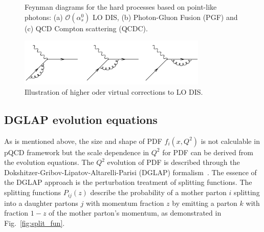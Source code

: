 \begin{figure}
	\begin{center}
	\quad
	\quad
	\caption[LO and NLO DIS feynman diagrams]{Feynman diagrams for the hard processes 
	based on point-like photons: (a) $\mathcal{O}(\alpha^{0}_{s}) $ LO DIS, (b) 
	Photon-Gluon Fusion (PGF) and (c) QCD Compton scattering (QCDC).}
	\label{fig:DISgraph}
	\end{center}
\end{figure}


\begin{figure}
\centering
\includegraphics[width=0.8\textwidth]{plots/chpt2/virtual_correction.png}
\caption[virtual corrections] {
Illustration of higher oder virtual corrections to LO DIS. }
\label{fig:VirtCorr}
\end{figure}


\subsection{DGLAP evolution equations}
As is mentioned above, the size and shape of PDF $f_{i}(x,Q^{2})$ is not
calculable in pQCD framework but the scale dependence in $Q^{2}$ for PDF can be
derived from the evolution equations. The $Q^{2}$ evolution of PDF is described
through the Dokshitzer-Gribov-Lipatov-Altarelli-Parisi (DGLAP)
formalism~\cite{Dokshitzer:1977sg,Gribov:1972ri,Altarelli:1977zs}. The essence
of the DGLAP approach is the perturbation treatment of splitting functions. The
splitting functions $P_{ij}(z)$ describe the probability of a
mother parton $i$ splitting into a daughter partons $j$ with momentum fraction
$z$ by emitting a parton $k$ with fraction $1-z$ of the mother parton's
momentum, as demonstrated in Fig.~\ref{fig:split_fun}.

